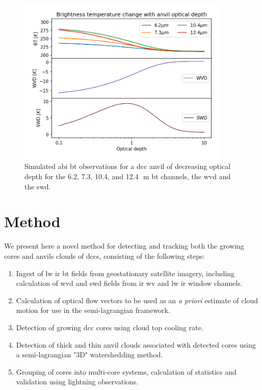 \begin{figure}[tp]
    \includegraphics[width=0.9\textwidth]{figures/chapter1_09.png}
    \caption[
    Simulated \acrshort{abi} \acrshort{bt} observations for a \acrshort{dcc} anvil of decreasing optical depth
    ]{
    Simulated \acrshort{abi} \acrshort{bt} observations for a \acrshort{dcc} anvil of decreasing optical depth for the 6.2, 7.3, 10.4, and 12.4\,\unit{\mu m} \acrshort{bt} channels, the \acrshort{wvd} and the \acrshort{swd}.
    }
    \label{fig:optical_depth_channels}
\end{figure}


\section{Method} \label{sec:tracking_method}

We present here a novel method for detecting and tracking both the growing cores and anvils clouds of \acrshort{dcc}s, consisting of the following steps:

\begin{enumerate}
    \item Ingest of \acrshort{lw} \acrshort{ir} \acrshort{bt} fields from geostationary satellite imagery, including calculation of \acrshort{wvd} and \acrshort{swd} fields from \acrshort{ir} \acrshort{wv} and \acrshort{lw} \acrshort{ir} window channels.
    \item Calculation of optical flow vectors to be used as an \textit{a priori} estimate of cloud motion for use in the semi-lagrangian framework.
    \item Detection of growing \acrshort{dcc} cores using cloud top cooling rate.
    \item Detection of thick and thin anvil clouds associated with detected cores using a semi-lagrangian "3D" watershedding method. 
    \item Grouping of cores into multi-core systems, calculation of statistics and validation using lightning observations.
\end{enumerate}



